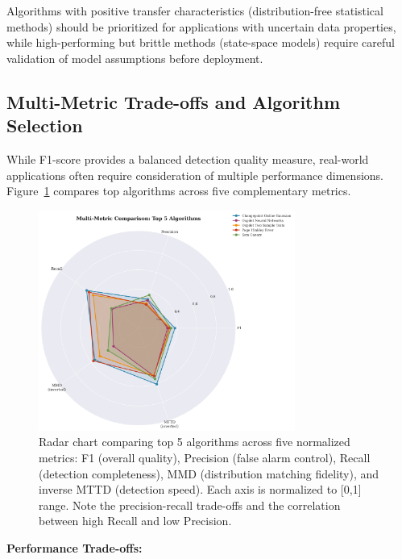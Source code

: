 \documentclass[journal,article,submit,pdftex,moreauthors]{Definitions/mdpi}
\begin{document}
Algorithms with positive transfer characteristics (distribution-free statistical methods) should be prioritized for applications with uncertain data properties, while high-performing but brittle methods (state-space models) require careful validation of model assumptions before deployment.


\subsection{Multi-Metric Trade-offs and Algorithm Selection}

While F1-score provides a balanced detection quality measure, real-world applications often require consideration of multiple performance dimensions. Figure~\ref{fig:radar_metrics} compares top algorithms across five complementary metrics.

\begin{figure}[H]
\centering
\includegraphics[width=0.75\textwidth]{figures/fig_radar_metrics.png}
\caption{Radar chart comparing top 5 algorithms across five normalized metrics: F1 (overall quality), Precision (false alarm control), Recall (detection completeness), MMD (distribution matching fidelity), and inverse MTTD (detection speed). Each axis is normalized to [0,1] range. Note the precision-recall trade-offs and the correlation between high Recall and low Precision.}
\label{fig:radar_metrics}
\end{figure}

\textbf{Performance Trade-offs:}
\end{document}
